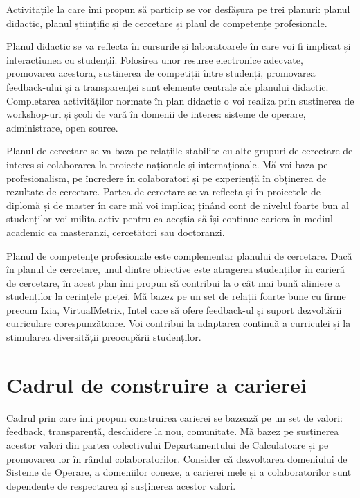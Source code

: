 \documentclass[11pt,a4paper]{article}
\begin{document}
Activitățile la care îmi propun să particip se vor desfășura pe trei planuri:
planul didactic, planul științific și de cercetare și plaul de competențe
profesionale.

Planul didactic se va reflecta în cursurile și laboratoarele în care voi fi
implicat și interacțiunea cu studenții. Folosirea unor resurse electronice
adecvate, promovarea acestora, susținerea de competiții între studenți,
promovarea feedback-ului și a transparenței sunt elemente centrale ale
planului didactic. Completarea activităților normate în plan didactic o voi
realiza prin susținerea de workshop-uri și școli de vară în domenii de
interes: sisteme de operare, administrare, open source.

Planul de cercetare se va baza pe relațiile stabilite cu alte grupuri de
cercetare de interes și colaborarea la proiecte naționale și internaționale.
Mă voi baza pe profesionalism, pe încredere în colaboratori și pe experiență
în obținerea de rezultate de cercetare. Partea de cercetare se va reflecta și
în proiectele de diplomă și de master în care mă voi implica; ținând cont de
nivelul foarte bun al studenților voi milita activ pentru ca aceștia să își
continue cariera în mediul academic ca masteranzi, cercetători sau doctoranzi.

Planul de competențe profesionale este complementar planului de cercetare.
Dacă în planul de cercetare, unul dintre obiective este atragerea studenților
în carieră de cercetare, în acest plan îmi propun să contribui la o cât mai
bună aliniere a studenților la cerințele pieței. Mă bazez pe un set de relații
foarte bune cu firme precum Ixia, VirtualMetrix, Intel care să ofere
feedback-ul și suport dezvoltării curriculare corespunzătoare. Voi contribui
la adaptarea continuă a curriculei și la stimularea diversității preocupării
studenților.

\section*{Cadrul de construire a carierei}

Cadrul prin care îmi propun construirea carierei se bazează pe un set de
valori: feedback, transparență, deschidere la nou, comunitate. Mă bazez pe
susținerea acestor valori din partea colectivului Departamentului de
Calculatoare și pe promovarea lor în rândul colaboratorilor. Consider că
dezvoltarea domeniului de Sisteme de Operare, a domeniilor conexe, a carierei
mele și a colaboratorilor sunt dependente de respectarea și susținerea acestor
valori.
\end{document}

